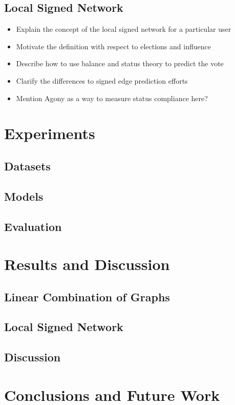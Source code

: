 \section{Local Signed Network}
\begin{itemize}
    \item Explain the concept of the local signed network for a particular user
    \item Motivate the definition with respect to elections and influence
    \item Describe how to use balance and status theory to predict the vote
    \item Clarify the differences to signed edge prediction efforts
    \item Mention Agony as a way to measure status compliance here?
\end{itemize}
\chapter{Experiments}
\section{Datasets}
\section{Models}
\section{Evaluation}

\chapter{Results and Discussion} 
\section{Linear Combination of Graphs}
\section{Local Signed Network}
\section{Discussion}

\chapter{Conclusions and Future Work}
